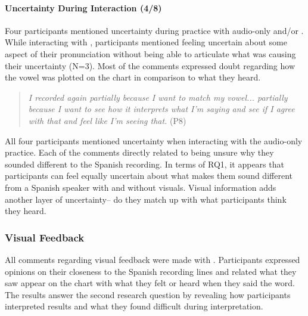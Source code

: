 \paragraph{Uncertainty During Interaction (4/8)}
Four participants mentioned uncertainty during practice with audio-only and/or \visowel{}. While interacting with \visowel{}, participants mentioned feeling uncertain about some aspect of their pronunciation without being able to articulate what was causing their uncertainty (N=3). Most of the comments expressed doubt regarding how the vowel was plotted on the chart in comparison to what they heard.
\begin{quote}
    \textit{I recorded again partially because I want to match my vowel... partially because I want to see how it interprets what I'm saying and see if I agree with that and feel like I'm seeing that.} (P8)
\end{quote}
All four participants mentioned uncertainty when interacting with the audio-only practice. Each of the comments directly related to being unsure why they sounded different to the Spanish recording. In terms of RQ1, it appears that participants can feel equally uncertain about what makes them sound different from a Spanish speaker with and without visuals. Visual information adds another layer of uncertainty-- do they match up with what participants think they heard.

\subsubsection{Visual Feedback}
\label{sec:VisFeed}
All comments regarding visual feedback were made with \visowel{}. Participants expressed opinions on their closeness to the Spanish recording lines and related what they saw appear on the chart with what they felt or heard when they said the word. The results answer the second research question by revealing how participants interpreted results and what they found difficult during interpretation.

